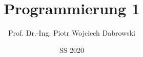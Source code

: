 \usepackage[utf8]{inputenc}
\usepackage[T1]{fontenc}
\usepackage[export]{adjustbox}
\usepackage{amssymb}


\title{Programmierung 1}
\date{SS 2020}
\author[PWD]{Prof. Dr.-Ing. Piotr Wojciech Dabrowski}

\usepackage{HTWBeamerTemplate/beamerthemeHTW}
